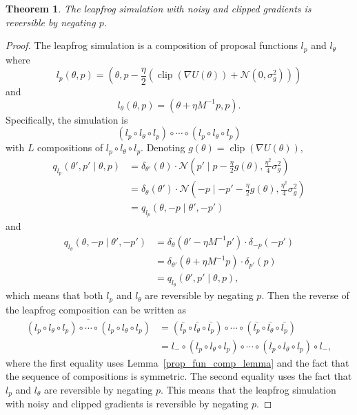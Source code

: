 \documentclass[english,twoside,openright]{HYgraduMLDS}
\newtheorem{theorem}{Theorem}
\newcommand{\caln}{{\mathcal{N}}}
\DeclareMathOperator{\clip}{clip}
\begin{document}
\begin{theorem}\label{leapfrog_revers_theorem}
  The leapfrog simulation with noisy and clipped gradients is reversible by
  negating \(p\).
\end{theorem}
\begin{proof}
  The leapfrog simulation is a composition of proposal functions
  \(l_{p}\) and \(l_{\theta}\) where
  \[
    l_{p}(\theta, p) = \left(\theta, p - \frac{\eta}{2}(\clip(\nabla U(\theta))
      + \caln(0, \sigma_{g}^{2}))\right)
  \]
  and
  \[
    l_{\theta}(\theta, p) = (\theta + \eta M^{-1}p, p).
  \]
  Specifically, the simulation is
  \[
    (l_{p} \circ l_{\theta}\circ l_{p})\circ
    \dotsb \circ (l_{p}\circ l_{\theta}\circ l_{p})
  \]
  with \(L\) compositions of \(l_{p} \circ l_{\theta}\circ l_{p}\).
  Denoting \(g(\theta) = \clip(\nabla U(\theta))\),
  \begin{align*}
    q_{l_{p}}(\theta', p'\mid \theta, p) &= \delta_{\theta'}(\theta)
    \cdot \caln\left(p'\mid p - \frac{\eta}{2}g(\theta), \frac{\eta^{2}}{4}\sigma_{g}^{2}\right)
    \\&= \delta_{\theta}(\theta')
    \cdot \caln\left(-p\mid -p' - \frac{\eta}{2}g(\theta), \frac{\eta^{2}}{4}\sigma_{g}^{2}\right)
    \\&= q_{l_{p}}(\theta, -p\mid \theta', -p')
  \end{align*}
  and
  \begin{align*}
	q_{l_{\theta}}(\theta, -p\mid \theta', -p')
    &= \delta_{\theta}(\theta' - \eta M^{-1}p')\cdot\delta_{-p}(-p')
    \\&= \delta_{\theta'}(\theta + \eta M^{-1}p)\cdot\delta_{p'}(p)
	\\&= q_{l_{\theta}}(\theta', p'\mid \theta, p),
  \end{align*}
  which means that both \(l_{p}\) and \(l_{\theta}\) are reversible by
  negating \(p\). Then the reverse of the leapfrog composition can be
  written as
  \begin{align*}
	\overline{(l_{p} \circ l_{\theta}\circ l_{p})\circ
    \dotsb \circ (l_{p}\circ l_{\theta}\circ l_{p})}
    &= (\bar{l_{p}}\circ \bar{l_{\theta}} \circ \bar{l_{p}}) \circ \dotsb \circ
    (\bar{l_{p}}\circ \bar{l_{\theta}} \circ \bar{l_{p}})
    \\&= l_{-}\circ(l_{p}\circ l_{\theta} \circ l_{p}) \circ \dotsb \circ
    (l_{p}\circ l_{\theta} \circ l_{p})\circ l_{-},
  \end{align*}
  where the first equality uses Lemma~\ref{prop_fun_comp_lemma} and
  the fact that the sequence of compositions is symmetric.
  The second equality uses the fact that \(l_{p}\) and \(l_{\theta}\)
  are reversible by negating \(p\).
  This means that the leapfrog simulation with noisy and clipped gradients is
  reversible by negating \(p\).
\end{proof}
\end{document}
